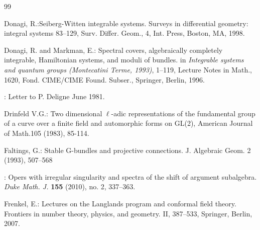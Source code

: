 \documentclass[12pt]{article}
\numberwithin{equation}{section}
\theoremstyle{remark}
\numberwithin{theorem}{section}
\numberwithin{equation}{section}
\begin{document}
\begin{thebibliography}{99}
	
	
	 Donagi, R.:Seiberg-Witten integrable systems. Surveys in differential geometry: integral systems  83--129,
Surv. Differ. Geom., 4, Int. Press, Boston, MA, 1998.
	
	 Donagi, R. {\rm and} Markman, E.: Spectral covers, algebraically completely integrable, Hamiltonian systems, and moduli of bundles. {in \em Integrable systems and quantum groups (Montecatini Terme, 1993)}, 1–119,
Lecture Notes in Math., 1620, Fond. CIME/CIME Found. Subser., Springer, Berlin, 1996.
	
	
	: Letter to P. Deligne June 1981.
	
	 Drinfeld V.G.: Two dimensional $\ell$-adic representations of the fundamental group of a curve over a finite field and automorphic forms on GL(2), American Journal of Math.105 (1983), 85-114.
	
		

	
		 { Faltings, G.}: Stable G-bundles and projective connections. J. Algebraic Geom. 2 (1993), 507--568 

	
	:
	Opers with irregular singularity and spectra of the shift of argument subalgebra. 
	{\em Duke Math. J. }{\bf 155} (2010), no. 2, 337--363.
	
 Frenkel, E.:
Lectures on the Langlands program and conformal field theory. Frontiers in number theory, physics, and geometry. II, 387--533, Springer, Berlin, 2007.
	

\end{thebibliography}
\end{document}

